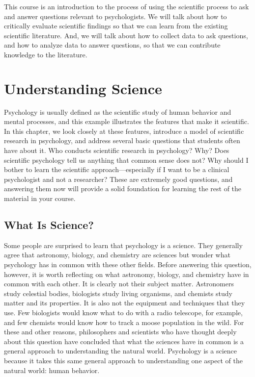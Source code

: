 \documentclass[]{book}
\theoremstyle{definition}
\theoremstyle{definition}
\theoremstyle{remark}
\begin{document}
This course is an introduction to the process of using the scientific
process to ask and answer questions relevant to psychologists. We will
talk about how to critically evaluate scientific findings so that we can
learn from the existing scientific literature. And, we will talk about
how to collect data to ask questions, and how to analyze data to answer
questions, so that we can contribute knowledge to the literature.

\section{Understanding Science}\label{understanding-science}

Psychology is usually defined as the scientific study of human behavior
and mental processes, and this example illustrates the features that
make it scientific. In this chapter, we look closely at these features,
introduce a model of scientific research in psychology, and address
several basic questions that students often have about it. Who conducts
scientific research in psychology? Why? Does scientific psychology tell
us anything that common sense does not? Why should I bother to learn the
scientific approach---especially if I want to be a clinical psychologist
and not a researcher? These are extremely good questions, and answering
them now will provide a solid foundation for learning the rest of the
material in your course.

\subsection{What Is Science?}\label{what-is-science}

Some people are surprised to learn that psychology is a science. They
generally agree that astronomy, biology, and chemistry are sciences but
wonder what psychology has in common with these other fields. Before
answering this question, however, it is worth reflecting on what
astronomy, biology, and chemistry have in common with each other. It is
clearly not their subject matter. Astronomers study celestial bodies,
biologists study living organisms, and chemists study matter and its
properties. It is also not the equipment and techniques that they use.
Few biologists would know what to do with a radio telescope, for
example, and few chemists would know how to track a moose population in
the wild. For these and other reasons, philosophers and scientists who
have thought deeply about this question have concluded that what the
sciences have in common is a general approach to understanding the
natural world. Psychology is a science because it takes this same
general approach to understanding one aspect of the natural world: human
behavior.
\end{document}
